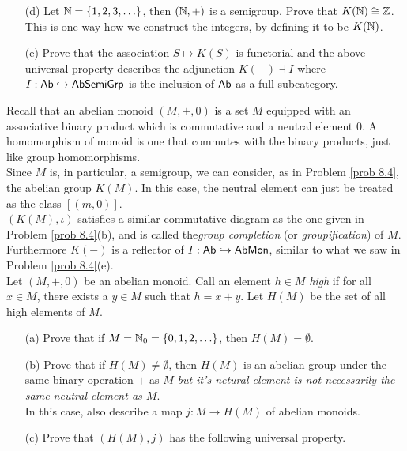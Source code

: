 \begin{problem}
\begin{itemize}
\item[(d)] Let $\mathbb N = \left\{1,2,3,\ldots\right\}$, then $(\mathbb N,+)$ is a semigroup. Prove that $K(\mathbb N) \cong \mathbb Z$. This is one way how we construct the integers, by defining it to be $K(\mathbb N)$.
\item[(e)] Prove that the association $S \mapsto K(S)$ is functorial and the above universal property describes the adjunction $K(-)\dashv I$ where $I:\mathsf{Ab} \hookrightarrow \mathsf{AbSemiGrp}$ is the inclusion of $\mathsf{Ab}$ as a full subcategory.
\end{itemize}
\end{problem}

\vspace*{0.1in}

\begin{problem}\label{prob 8.4a}
Recall that an abelian monoid $(M,+,0)$ is a set $M$ equipped with an associative binary product which is commutative and a neutral element $0$. A homomorphism of monoid is one that commutes with the binary products, just like group homomorphisms.\\[0.5em]
Since $M$ is, in particular, a semigroup, we can consider, as in Problem \ref{prob 8.4}, the abelian group $K(M)$. In this case, the neutral element can just be treated as the class $[(m,0)]$.\\[0.5em]
$(K(M),\iota)$ satisfies a similar commutative diagram as the one given in Problem \ref{prob 8.4}(b), and is called the\emph{group completion} (or \emph{groupification}) of $M$. Furthermore $K(-)$ is a reflector of $I:\mathsf{Ab} \hookrightarrow \mathsf{AbMon}$, similar to what we saw in Problem \ref{prob 8.4}(e).\\[1em]
Let $(M,+,0)$ be an abelian monoid. Call an element $h \in M$ \emph{high} if for all $x \in M$, there exists a $y \in M$ such that $h = x + y$. Let $H(M)$ be the set of all high elements of $M$.
\begin{itemize}
\item[(a)] Prove that if $M = \mathbb N_0 = \left\{0,1,2,\ldots\right\}$, then $H(M) = \emptyset$.
\item[(b)] Prove that if $H(M) \neq \emptyset$, then $H(M)$ is an abelian group  under the same binary operation $+$ as $M$ \emph{but it's netural element is not necessarily the same neutral element as $M$}.\\[0.5em]
In this case, also describe a map $j:M \to H(M)$ of abelian monoids.
\item[(c)] Prove that $(H(M),j)$ has the following universal property.\\[0.5em]

\end{itemize}
\end{problem}
